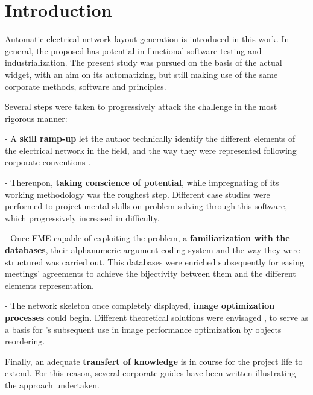 \section{Introduction}

Automatic electrical network layout generation is introduced in this work. In general, the proposed  has potential in functional software testing and industrialization. The present study was pursued on the basis of the actual widget, with an aim on its automatizing, but still making use of the same corporate methods, software and principles.

Several steps were taken to progressively attack the challenge in the most rigorous manner:
\begin{description}
    
    \item - A \textbf{skill ramp-up} let the author technically identify the different elements of the electrical network in the field, and the way they were represented following corporate conventions \cite{doctrine_cod_sites, doctrine_cod_liaisons, doctrine_cod_postes}.
    
    \item - Thereupon, \textbf{taking conscience of  potential}, while impregnating of its working methodology was the roughest step. Different case studies were performed to project mental skills on problem solving through this software, which progressively increased in difficulty.
    
    \item - Once FME-capable of exploiting the problem, a \textbf{familiarization with the databases}, their alphanumeric argument coding system and the way they were structured was carried out. This databases were enriched subsequently for easing meetings' agreements to achieve the bijectivity between them and the different elements representation.
    
    \item - The network skeleton once completely displayed, \textbf{image optimization processes} could begin. Different theoretical solutions were envisaged \cite{Genetic_algorithms, AlgoAIG}, to serve as a basis for 's subsequent use in image performance optimization by objects reordering. 

\end{description}

Finally, an adequate \textbf{transfert of knowledge} is in course for the project life to extend. For this reason, several corporate guides have been written illustrating the approach undertaken.

